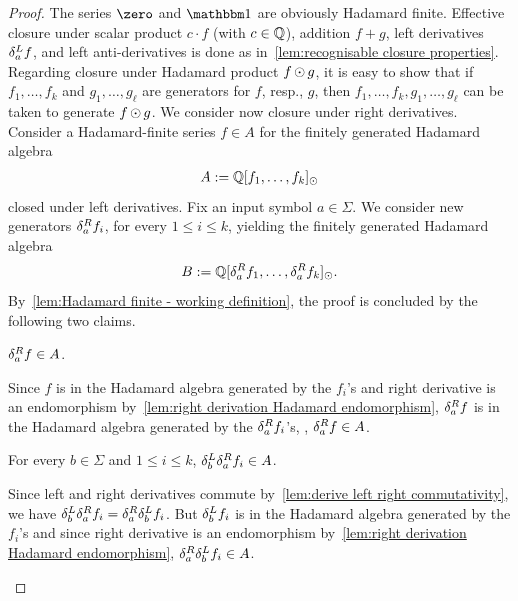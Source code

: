 \begin{proof}
    The series $\zero$ and $\one$ are obviously Hadamard finite.
    Effective closure under scalar product $c \cdot f$ (with $c \in \mathbb Q$), addition $f + g$,
    left derivatives $\delta^L_{a} f$, and left anti-derivatives is done as in~\cref{lem:recognisable closure properties}.
    Regarding closure under Hadamard product $f \operatorname{\odot} g$,
    it is easy to show that if $f_1, \dots, f_k$ and $g_1, \dots, g_\ell$ are generators for $f$, resp., $g$,
    then $f_1, \dots, f_k, g_1, \dots, g_\ell$ can be taken to generate $f \operatorname{\odot} g$.
    We consider now closure under right derivatives.
    Consider a Hadamard-finite series $f \in A$ for the finitely generated Hadamard algebra
    \begin{align*}
        A := \mathbb Q[f_1, \dots, f_k]_{\operatorname{\odot}}
    \end{align*}
    closed under left derivatives.
    Fix an input symbol $a \in \Sigma$.
    We consider new generators $\delta^R_{a} f_i$, for every $1 \leq i \leq k$,
    yielding the finitely generated Hadamard algebra 
    \begin{align*}
        B := \mathbb Q[\delta^R_{a} f_1, \dots, \delta^R_{a} f_k]_{\operatorname{\odot}}.
    \end{align*}
    By~\cref{lem:Hadamard finite - working definition},
    the proof is concluded by the following two claims.
    \begin{claim*}
        $\delta^R_{a} f \in A$.
    \end{claim*}
    \begin{claimproof}
        Since $f$ is in the Hadamard algebra generated by the $f_i$'s
        and right derivative is an endomorphism by~\cref{lem:right derivation Hadamard endomorphism},
        $\delta^R_{a} f$ is in the Hadamard algebra generated by the $\delta^R_{a} f_i$'s,
        \ie, $\delta^R_{a} f \in A$.
    \end{claimproof}
    \begin{claim*}
        For every $b \in \Sigma$ and $1 \leq i \leq k$,
        $\delta^L_{b} \delta^R_{a} f_i \in A$.
    \end{claim*}
    \begin{claimproof}
        Since left and right derivatives commute by~\cref{lem:derive left right commutativity},
        we have $\delta^L_{b} \delta^R_{a} f_i = \delta^R_{a} \delta^L_{b} f_i$.
        But $\delta^L_{b} f_i$ is in the Hadamard algebra generated by the $f_i$'s
        and since right derivative is an endomorphism by~\cref{lem:right derivation Hadamard endomorphism},
        $\delta^R_{a} \delta^L_{b} f_i \in A$.
    \end{claimproof}
\end{proof}

